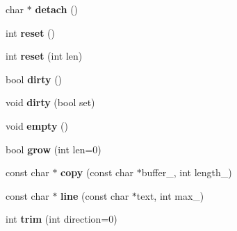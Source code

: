\begin{DoxyCompactItemize}
\item 
char $\ast$ {\bfseries detach} ()\hypertarget{class_magnum_1_1_string_a7c68bda3f739e0b745b5159d9c5d1558}{}\label{class_magnum_1_1_string_a7c68bda3f739e0b745b5159d9c5d1558}

\item 
int {\bfseries reset} ()\hypertarget{class_magnum_1_1_string_aaefe2fc5f3e73afa944208e0bcc1dd85}{}\label{class_magnum_1_1_string_aaefe2fc5f3e73afa944208e0bcc1dd85}

\item 
int {\bfseries reset} (int len)\hypertarget{class_magnum_1_1_string_ad811a45729246dd144d64bb7ff8fb8de}{}\label{class_magnum_1_1_string_ad811a45729246dd144d64bb7ff8fb8de}

\item 
bool {\bfseries dirty} ()\hypertarget{class_magnum_1_1_string_a1505bb251fd7c272601a15cf202d840e}{}\label{class_magnum_1_1_string_a1505bb251fd7c272601a15cf202d840e}

\item 
void {\bfseries dirty} (bool set)\hypertarget{class_magnum_1_1_string_a393769f89bf0e30e089aa06358eb1b46}{}\label{class_magnum_1_1_string_a393769f89bf0e30e089aa06358eb1b46}

\item 
void {\bfseries empty} ()\hypertarget{class_magnum_1_1_string_a815d15beb4344c84cdd68217af601620}{}\label{class_magnum_1_1_string_a815d15beb4344c84cdd68217af601620}

\item 
bool {\bfseries grow} (int len=0)\hypertarget{class_magnum_1_1_string_a0a12d4fc0976cb9b213c4adb2ffb3982}{}\label{class_magnum_1_1_string_a0a12d4fc0976cb9b213c4adb2ffb3982}

\item 
const char $\ast$ {\bfseries copy} (const char $\ast$buffer\+\_\+, int length\+\_)\hypertarget{class_magnum_1_1_string_a4b4f700f0696c51158db7f4b2a481e0a}{}\label{class_magnum_1_1_string_a4b4f700f0696c51158db7f4b2a481e0a}

\item 
const char $\ast$ {\bfseries line} (const char $\ast$text, int max\+\_)\hypertarget{class_magnum_1_1_string_a66702a146802fb481930b0d36c20059f}{}\label{class_magnum_1_1_string_a66702a146802fb481930b0d36c20059f}

\item 
int {\bfseries trim} (int direction=0)\hypertarget{class_magnum_1_1_string_a9e2f7ef48df311be8e1f5787d86cc7d2}{}\label{class_magnum_1_1_string_a9e2f7ef48df311be8e1f5787d86cc7d2}


\end{DoxyCompactItemize}
